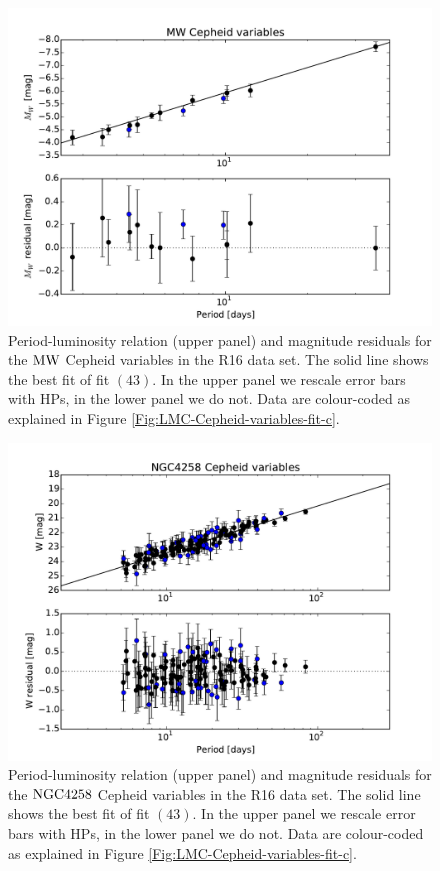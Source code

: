 \begin{figure}[hbtp]
\centering
\includegraphics[width=\textwidth]{figures/chapter-h0/effective_HP_cepheids_MW_r16.pdf}
\caption{Period-luminosity relation (upper panel) and magnitude residuals for the $\mathrm{MW}$ Cepheid variables in the R16 data set. The solid  line shows the best fit of fit $(43)$. In the upper panel we rescale error bars with HPs, in the lower panel we do not. Data are colour-coded as explained in Figure \ref{Fig:LMC-Cepheid-variables-fit-c}.}
\label{Fig:R16-MW}
\end{figure}

\begin{figure}[hbtp]
\centering
\includegraphics[width=\textwidth]{figures/chapter-h0/effective_HP_cepheids_NGC4258_R16.pdf}
\caption{Period-luminosity relation (upper panel) and magnitude residuals for the $\mathrm{NGC4258}$ Cepheid variables in the R16 data set. The solid line shows the best fit of fit $(43)$. In the upper panel we rescale error bars with HPs, in the lower panel we do not. Data are colour-coded as explained in Figure \ref{Fig:LMC-Cepheid-variables-fit-c}.}
\label{Fig:R16-4258}
\end{figure}

